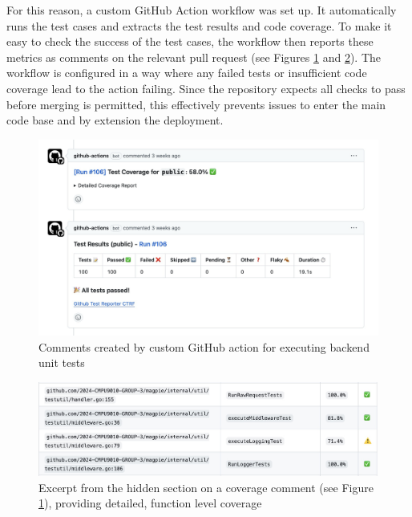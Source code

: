 For this reason, a custom GitHub Action workflow was set up. It automatically
runs the test cases and extracts the test results and code coverage. To make it
easy to check the success of the test cases, the workflow then reports these
metrics as comments on the relevant pull request (see Figures
\ref{fig:backend_github_action} and \ref{fig:backend_github_action_coverage}).
The workflow is configured in a way where any failed tests or insufficient code
coverage lead to the action failing. Since the repository expects all checks to
pass before merging is permitted, this effectively prevents issues to enter the
main code base and by extension the deployment.

\begin{figure}[htbp]
  \centering{}
  \includegraphics[width=\textwidth]{images/backend_github_action.png}
  \caption{Comments created by custom GitHub action for executing backend unit tests}
  \label{fig:backend_github_action}
\end{figure}

\begin{figure}[htbp]
  \centering{}
  \includegraphics[width=\textwidth]{images/backend_github_action_coverage.png}
  \caption{Excerpt from the hidden section on a coverage comment (see Figure
  \ref{fig:backend_github_action}), providing detailed, function level coverage}
  \label{fig:backend_github_action_coverage}
\end{figure}

\newpage{}